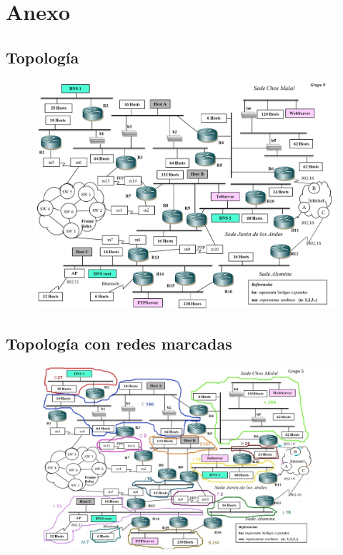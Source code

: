 \documentclass[12pt, a4paper, spanish]{article}
\begin{document}
\newpage
\section{Anexo}
\subsection{Topología}
\begin{figure}[h!]
	\centering
	\includegraphics[scale=0.45,angle=90]{diagramas/topologia.png} \\
\end{figure}

\subsection{Topología con redes marcadas}
\begin{figure}[h!]
	\centering
	\includegraphics[scale=0.85,angle=90]{diagramas/topologia_marcada.jpg} \\
\end{figure}

\end{document}
